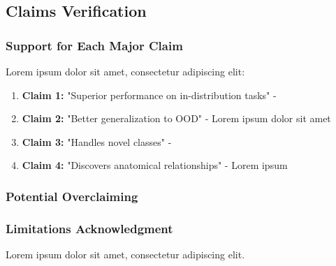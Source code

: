 \subsection{Claims Verification}
\subsubsection{Support for Each Major Claim}
Lorem ipsum dolor sit amet, consectetur adipiscing elit:
\begin{enumerate}
    \item \textbf{Claim 1:} "Superior performance on in-distribution tasks" - 
    \item \textbf{Claim 2:} "Better generalization to OOD" - Lorem ipsum dolor sit amet
    \item \textbf{Claim 3:} "Handles novel classes" - 
    \item \textbf{Claim 4:} "Discovers anatomical relationships" - Lorem ipsum
\end{enumerate}

\subsubsection{Potential Overclaiming}

\subsubsection{Limitations Acknowledgment}
Lorem ipsum dolor sit amet, consectetur adipiscing elit. 